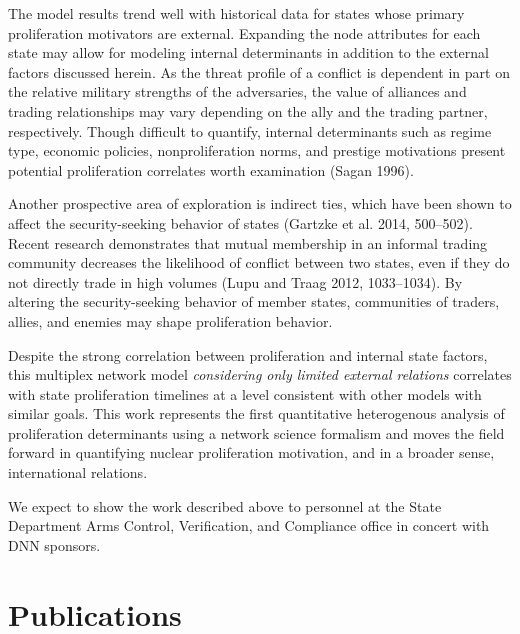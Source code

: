 \documentclass{article} %
\begin{document}
{The model results trend well with historical data for states whose primary proliferation motivators are external. Expanding the node attributes for each state may allow for modeling internal determinants in addition to the external factors discussed herein. As the threat profile of a conflict is dependent in part on the relative military strengths of the adversaries, the value of alliances and trading relationships may vary depending on the ally and the trading partner, respectively. Though difficult to quantify, internal determinants such as regime type, economic policies, nonproliferation norms, and prestige motivations present potential proliferation correlates worth examination (Sagan 1996). 

Another prospective area of exploration is indirect ties, which have been shown to affect the security-seeking behavior of states (Gartzke et al. 2014, 500--502). Recent research demonstrates that mutual membership in an informal trading community decreases the likelihood of conflict between two states, even if they do not directly trade in high volumes (Lupu and Traag 2012, 1033--1034). By altering the security-seeking behavior of member states, communities of traders, allies, and enemies may shape proliferation behavior.

Despite the strong correlation between proliferation and internal state factors, this multiplex network model \textit{considering only limited external relations} correlates with state proliferation timelines at a level consistent with other models with similar goals. This work represents the first quantitative heterogenous analysis of proliferation determinants using a network science formalism and moves the field forward in quantifying nuclear proliferation motivation, and in a broader sense, international relations. 

We expect to show the work described above to personnel at the State Department Arms Control, Verification, and Compliance office in concert with DNN sponsors.  

\newpage
\thispagestyle{empty}
\mbox{}
\newpage

\section{Publications}
}
\end{document}
